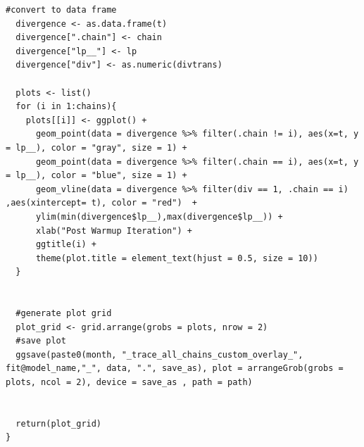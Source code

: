 \documentclass[ngerman]{ttlab-qualify}
\begin{document}
\begin{lstlisting}[style=custom, caption={\textit{R}-Script zur Erstellung verschiedener Diagnose-Plots},label={r:all-plots}]
  #convert to data frame
  divergence <- as.data.frame(t)
  divergence[".chain"] <- chain
  divergence["lp__"] <- lp
  divergence["div"] <- as.numeric(divtrans)
  
  plots <- list()
  for (i in 1:chains){
    plots[[i]] <- ggplot() +
      geom_point(data = divergence %>% filter(.chain != i), aes(x=t, y = lp__), color = "gray", size = 1) +
      geom_point(data = divergence %>% filter(.chain == i), aes(x=t, y = lp__), color = "blue", size = 1) +
      geom_vline(data = divergence %>% filter(div == 1, .chain == i) ,aes(xintercept= t), color = "red")  +
      ylim(min(divergence$lp__),max(divergence$lp__)) +
      xlab("Post Warmup Iteration") +
      ggtitle(i) +
      theme(plot.title = element_text(hjust = 0.5, size = 10))
  }
  
  
  #generate plot grid 
  plot_grid <- grid.arrange(grobs = plots, nrow = 2)
  #save plot
  ggsave(paste0(month, "_trace_all_chains_custom_overlay_", fit@model_name,"_", data, ".", save_as), plot = arrangeGrob(grobs = plots, ncol = 2), device = save_as , path = path)
  
  
  return(plot_grid)
}
\end{lstlisting}
\end{document}
